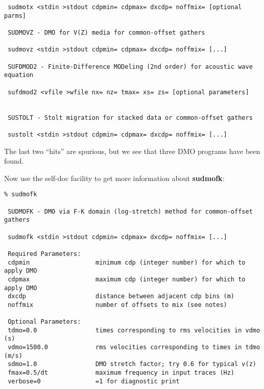 {{{\begin{verbatim}
 sudmotx <stdin >stdout cdpmin= cdpmax= dxcdp= noffmix= [optional parms]

 SUDMOVZ - DMO for V(Z) media for common-offset gathers

 sudmovz <stdin >stdout cdpmin= cdpmax= dxcdp= noffmix= [...]     

 SUFDMOD2 - Finite-Difference MODeling (2nd order) for acoustic wave equation

 sufdmod2 <vfile >wfile nx= nz= tmax= xs= zs= [optional parameters]     


 SUSTOLT - Stolt migration for stacked data or common-offset gathers    

 sustolt <stdin >stdout cdpmin= cdpmax= dxcdp= noffmix= [...]           
\end{verbatim}}\noindent
The last two ``hits'' are spurious,
but we see that three DMO programs have been found.

Now use the self-doc facility to get more information about {\bf sudmofk\/}:
{\small\begin{verbatim}
% sudmofk
                                                                        
 SUDMOFK - DMO via F-K domain (log-stretch) method for common-offset gathers
                                                                        
 sudmofk <stdin >stdout cdpmin= cdpmax= dxcdp= noffmix= [...]           
                                                                        
 Required Parameters:                                                   
 cdpmin                  minimum cdp (integer number) for which to apply DMO
 cdpmax                  maximum cdp (integer number) for which to apply DMO
 dxcdp                   distance between adjacent cdp bins (m) 
 noffmix                 number of offsets to mix (see notes)           
                                                                        
 Optional Parameters:                                                   
 tdmo=0.0                times corresponding to rms velocities in vdmo (s)
 vdmo=1500.0             rms velocities corresponding to times in tdmo (m/s)
 sdmo=1.0                DMO stretch factor; try 0.6 for typical v(z)   
 fmax=0.5/dt             maximum frequency in input traces (Hz) 
 verbose=0               =1 for diagnostic print                        
                                                                        

\end{verbatim}}}}
